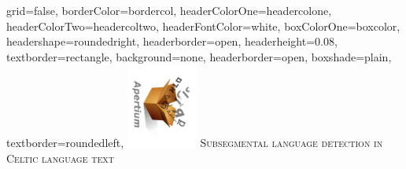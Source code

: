 \documentclass[a0paper,fontscale=0.3]{baposter}  %
\begin{document}
	\setlength{\pdfpageheight}{\paperheight}
	\setlength{\pdfpagewidth}{\paperwidth}

	\background{{
	}}



	\begin{poster}{
			grid=false,
			borderColor=bordercol,
			headerColorOne=headercolone,
			headerColorTwo=headercoltwo,
			headerFontColor=white,
			boxColorOne=boxcolor,
			headershape=roundedright,
  headerborder=open,
  headerheight=0.08\textheight,
			textborder=rectangle,
			background=none,
			headerborder=open,
			boxshade=plain,
			textborder=roundedleft,
		}{
			\hspace{-2em}\includegraphics[angle=90,height=7.5em]{apertium5a}
		}{
			{\vspace{0pt}\hspace{-2.2ex}
			{\titlefont \textsc{Subsegmental language detection in Celtic language text}}}
		}{

}
\end{poster}
\end{document}
